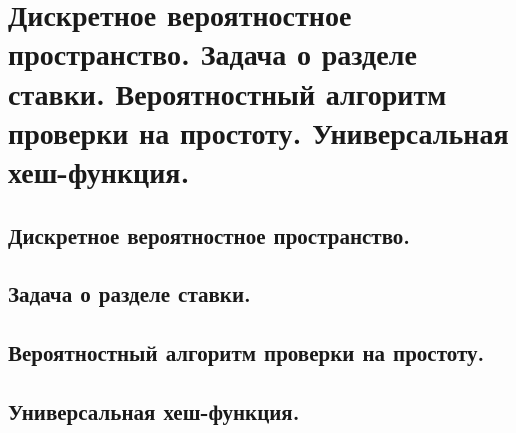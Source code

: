 \section{Дискретное вероятностное пространство. Задача о разделе ставки. Вероятностный алгоритм проверки на простоту. Универсальная хеш-функция.}

\subsection{Дискретное вероятностное пространство.}

\subsection{Задача о разделе ставки.}

\subsection{Вероятностный алгоритм проверки на простоту.}

\subsection{Универсальная хеш-функция.}